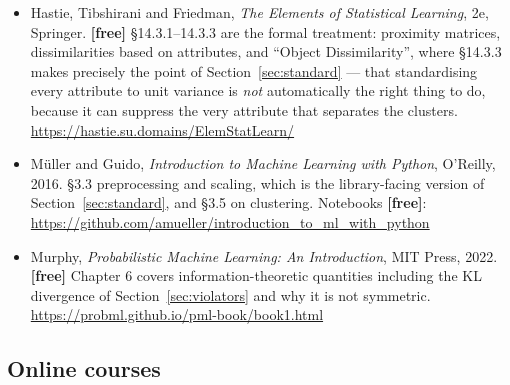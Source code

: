 \documentclass[11pt]{article}
\begin{document}
\begin{itemize}[leftmargin=*]
    Section~\ref{sec:cosine}, and \S12.4.3 (``Practical Issues in
    Clustering'') is Section~\ref{sec:standard} in different words.
    \url{https://www.statlearning.com/}
  \item Hastie, Tibshirani and Friedman, \emph{The Elements of Statistical
    Learning}, 2e, Springer. \textbf{[free]} \S14.3.1--14.3.3 are the formal
    treatment: proximity matrices, dissimilarities based on attributes, and
    ``Object Dissimilarity'', where \S14.3.3 makes precisely the point of
    Section~\ref{sec:standard} --- that standardising every attribute to
    unit variance is \emph{not} automatically the right thing to do, because
    it can suppress the very attribute that separates the clusters.
    \url{https://hastie.su.domains/ElemStatLearn/}
  \item M\"uller and Guido, \emph{Introduction to Machine Learning with
    Python}, O'Reilly, 2016. \S3.3 preprocessing and scaling, which is the
    library-facing version of Section~\ref{sec:standard}, and \S3.5 on
    clustering. Notebooks \textbf{[free]}:
    \url{https://github.com/amueller/introduction_to_ml_with_python}
  \item Murphy, \emph{Probabilistic Machine Learning: An Introduction}, MIT
    Press, 2022. \textbf{[free]} Chapter 6 covers information-theoretic
    quantities including the KL divergence of Section~\ref{sec:violators}
    and why it is not symmetric.
    \url{https://probml.github.io/pml-book/book1.html}
\end{itemize}

\subsection*{Online courses}
\end{document}
